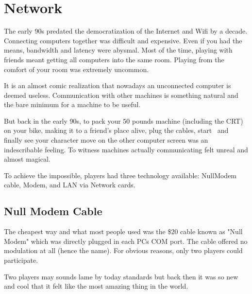 \section{Network}
The early 90s predated the democratization of the Internet and Wifi by a decade. Connecting computers together was difficult and expensive. Even if you had the means, bandwidth and latency were abysmal. Most of the time, playing with friends meant getting all computers into the same room. Playing from the comfort of your room was extremely uncommon.\\
\par
It is an almost comic realization that nowadays an unconnected computer is deemed useless. Communication with other machines is something natural and the bare minimum for a machine to be useful.\\
\par
 But back in the early 90s, to pack your 50 pounds machine (including the CRT) on your bike, making it to a friend's place alive, plug the cables, start \doom~and finally see your character move on the other computer screen was an indescribable feeling. To witness machines actually communicating felt unreal and almost magical.\\
\par 
To achieve the impossible, players had three technology available: NullModem cable, Modem, and LAN via Network cards.









\subsection{Null Modem Cable}
The cheapest way and what most people used was the \$20 cable known as "Null Modem" which was directly plugged in each PCs COM port. The cable offered no modulation at all (hence the name). For obvious reasons, only two players could participate.\\
\par 
{}
\par
 Two players may sounds lame by today standards but back then it was so new and cool that it felt like the most amazing thing in the world.







